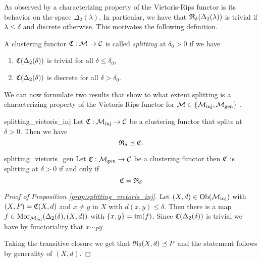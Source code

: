 As observed by \cite[Thm.~6.4]{Carlsson2010} a characterizing property of the Vietoris-Rips functor is its behavior on the space $\Delta_2(\lambda)$. In particular, we have that $\mathfrak{R}_\delta(\Delta_2(\lambda))$ is trivial if $\lambda \le \delta$ and discrete otherwise.
This motivates the following definition.

\begin{definition}{}{}
    A clustering functor $\mathfrak{C}: \mathcal{M} \to \mathcal{C}$ is called \emph{splitting} at $\delta_0 > 0$ if we have
    \begin{enumerate}
        \item $\mathfrak{C}(\Delta_2(\delta))$ is trivial for all $\delta \leq \delta_0$,
        \item $\mathfrak{C}(\Delta_2(\delta))$ is discrete for all $\delta > \delta_0$.
    \end{enumerate}
\end{definition}

We can now formulate two results that show to what extent splitting is a characterizing property of the Vietoris-Rips functor for $\mathcal{M} \in \{{\mathcal{M}_\mathrm{inj}}, {\mathcal{M}_\mathrm{gen}}\}$ \cite[Thm.~6.4]{Carlsson2010}.

\begin{proposition}{}{splitting_vietoris_inj}
    Let $\mathfrak{C}: {\mathcal{M}_\mathrm{inj}} \to \mathcal{C}$ be a clustering functor that splits at $\delta > 0$. Then we have 
    $$
    \mathfrak{R}_\delta \preceq \mathfrak{C}.
    $$
\end{proposition}


\begin{proposition}{}{splitting_vietoris_gen}
    Let $\mathfrak{C}: {\mathcal{M}_\mathrm{gen}} \to \mathcal{C}$ be a clustering functor then $\mathfrak{C}$ is splitting at $\delta > 0$ if and only if 
    $$
    \mathfrak{C} = \mathfrak{R}_\delta
    $$
\end{proposition}

\begin{proof}[Proof of Proposition \ref{prop:splitting_vietoris_inj}]
    Let $(X,d) \in \mathrm {Ob}({\mathcal{M}_\mathrm{inj}})$ with $(X,P) = \mathfrak{C}(X,d)$ and $x \neq y$ in $X$ with $d(x,y) \leq \delta$.
    Then there is a map $f \in \mathrm {Mor}_{\mathcal{M}_\mathrm{inj}}(\Delta_2(\delta), (X,d))$ with $\{x,y\} = \operatorname*{im}(f)$.
    Since $\mathfrak{C}(\Delta_2(\delta))$ is trivial we have by functoriality that $x \sim_P y$

    Taking the transitive closure we get that $\mathfrak{R}_\delta(X,d) \preceq P$ and the statement follows by generality of $(X,d)$.
\end{proof}

